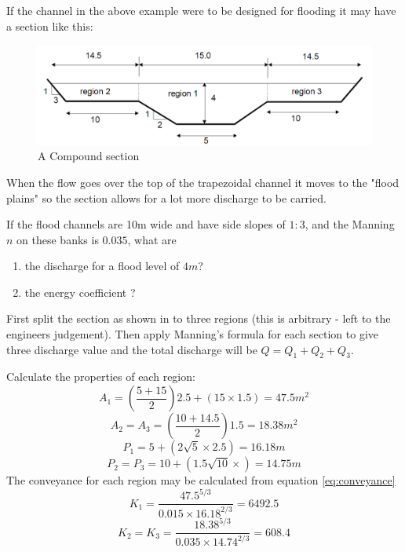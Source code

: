 \documentclass[a4paper, 12pt, british]{article} %
\numberwithin{equation}{section}
\numberwithin{figure}{section}
\numberwithin{table}{section}
\begin{document}
If the channel in the above example were to be designed for flooding it may have a section like this:

\begin{figure}[H]
	\centering
	\includegraphics[scale=0.5]{./images/fig_eg41.png}
	\caption{A Compound section}
	\label{fig:eg41}
\end{figure}
When the flow goes over the top of the trapezoidal channel it moves to the "flood plains" so the section allows for a lot more discharge to be carried.

If the flood channels are 10m wide and have side slopes of $1:3$, and the Manning $n$ on these banks is $0.035$, what are
\begin{enumerate}[label=\alph*,noitemsep]
	\item the discharge for a flood level of $4m$?
	\item the energy coefficient ?
\end{enumerate}
First split the section as shown in to three regions (this is arbitrary - left to the engineers judgement). 
Then apply Manning's formula for each section to give three discharge value and the total discharge will be $Q = Q_1 + Q_2 + Q_3$.

Calculate the properties of each region:
\begin{equation*}
A_1 = \left( \frac{5+15}{2}\right)2.5+(15 \times 1.5) = 47.5m^2
\end{equation*}
\begin{equation*}
A_2 = A_3 = \left( \frac{10+14.5}{2}\right)1.5 = 18.38m^2
\end{equation*}
\begin{equation*}
P_1 = 5 + \left(2 \sqrt{5}\times 2.5\right) = 16.18m
\end{equation*}
\begin{equation*}
P_2 = P_3=10 + \left(1.5 \sqrt{10}\times \right) = 14.75m
\end{equation*}
The conveyance for each region may be calculated from equation \ref{eq:conveyance}
\begin{equation*}
K_1 =\frac{47.5^{5/3}}{0.015 \times 16.18^{2/3}} = 6492.5
\end{equation*}
\begin{equation*}
K_2 = K_3 =\frac{18.38^{5/3}}{0.035 \times 14.74^{2/3}} = 608.4
\end{equation*}
\end{document}
